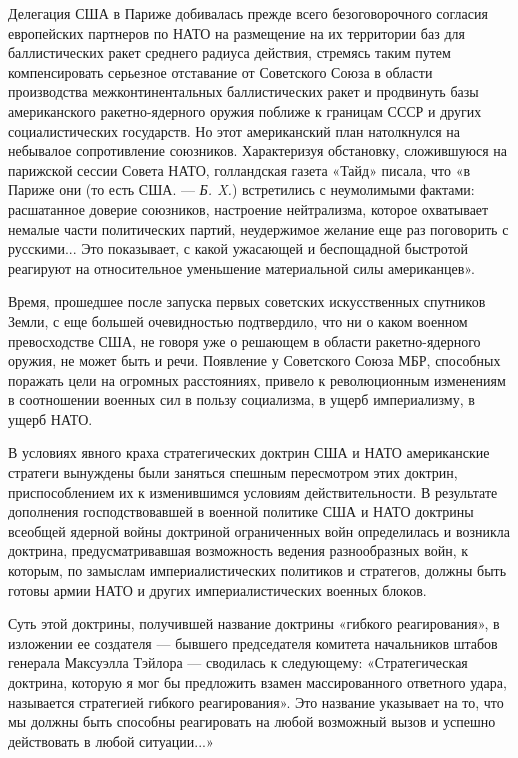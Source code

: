 \documentclass[12pt, a4paper, openany]{book}
\begin{document}
		Делегация США в Париже добивалась прежде всего безоговорочного согласия европейских партнеров по НАТО на размещение на их территории баз для баллистических ракет среднего радиуса действия, стремясь таким путем компенсировать серьезное отставание от Советского Союза в области производства межконтинентальных баллистических ракет и продвинуть базы американского ракетно-ядерного оружия поближе к границам СССР и других социалистических государств. Но этот американский план натолкнулся на небывалое сопротивление союзников. Характеризуя обстановку, сложившуюся на парижской сессии Совета НАТО, голландская газета «Тайд» писала, что «в Париже они (то есть США. — \textit{Б. X.}) встретились с неумолимыми фактами: расшатанное доверие союзников, настроение нейтрализма, которое охватывает немалые части политических партий, неудержимое желание еще раз поговорить с русскими... Это показывает, с какой ужасающей и беспощадной быстротой реагируют на относительное уменьшение материальной силы американцев».
		
		Время, прошедшее после запуска первых советских искусственных спутников Земли, с еще большей очевидностью подтвердило, что ни о каком военном превосходстве США, не говоря уже о решающем в области ракетно-ядерного оружия, не может быть и речи.
		Появление у Советского Союза МБР, способных поражать цели на огромных расстояниях, привело к революционным изменениям в соотношении военных сил в пользу социализма, в ущерб империализму, в ущерб НАТО.
		
		В условиях явного краха стратегических доктрин США и НАТО американские стратеги вынуждены были заняться спешным пересмотром этих доктрин, приспособлением их к изменившимся условиям действительности. В результате дополнения господствовавшей в военной политике США и НАТО доктрины всеобщей ядерной войны доктриной ограниченных войн определилась и возникла доктрина, предусматривавшая возможность ведения разнообразных войн, к которым, по замыслам империалистических политиков и стратегов, должны быть готовы армии НАТО и других империалистических военных блоков.
		
		Суть этой доктрины, получившей название доктрины «гибкого реагирования», в изложении ее создателя — бывшего председателя комитета начальников штабов генерала Максуэлла Тэйлора — сводилась к следующему: «Стратегическая доктрина, которую я мог бы предложить взамен массированного ответного удара, называется стратегией гибкого реагирования». Это название указывает на то, что мы должны быть способны реагировать на любой возможный вызов и успешно действовать в любой ситуации...»
		
\end{document}
